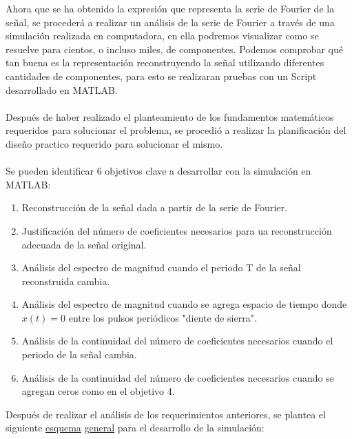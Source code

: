 \documentclass[12pt]{article}
\begin{document}
    Ahora que se ha obtenido la expresión que representa la serie de Fourier de la señal, se procederá a realizar 
    un análisis de la serie de Fourier a través de una simulación realizada en computadora, en ella podremos 
    visualizar como se resuelve para cientos, o incluso miles, de componentes. Podemos comprobar qué tan buena 
    es la representación reconstruyendo la señal utilizando diferentes cantidades de componentes, para esto 
    se realizaran pruebas con un Script desarrollado en MATLAB.\\
    \\
    Después de haber realizado el planteamiento de los fundamentos matemáticos requeridos para solucionar 
    el problema, se procedió a realizar la planificación del diseño practico requerido para solucionar 
    el mismo.\\
    \\
    Se pueden identificar 6 objetivos clave a desarrollar con la simulación en MATLAB:\\

    \begin{enumerate}
        \item Reconstrucción de la señal dada a partir de la serie de Fourier.
        \item Justificación del número de coeficientes necesarios para ua reconstrucción adecuada de la 
            señal original.
        \item Análisis del espectro de magnitud cuando el periodo T de la señal reconstruida cambia.
        \item Análisis del espectro de magnitud cuando se agrega espacio de tiempo donde $x(t)=0$ entre 
            los pulsos periódicos "diente de sierra".
        \item Análisis de la continuidad del número de coeficientes necesarios cuando el periodo de la 
            señal cambia.
        \item Análisis de la continuidad del número de coeficientes necesarios cuando se agregan ceros 
            como en el objetivo 4.
    \end{enumerate}

    Después de realizar el análisis de los requerimientos anteriores, se plantea el siguiente \underline{esquema}
    \underline{general} para el desarrollo de la simulación:
    \\
\end{document}
